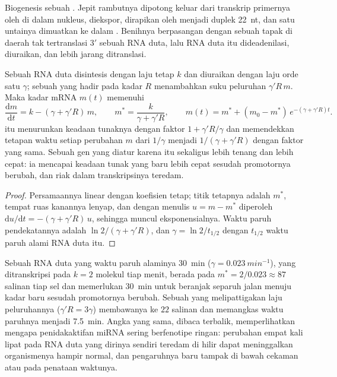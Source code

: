 \begin{omfigure}
{\small Biogenesis sebuah . Jepit rambutnya dipotong keluar dari
transkrip primernya oleh  di dalam nukleus, diekspor, dirapikan oleh
 menjadi duplek \qty{22}{nt}, dan satu untainya dimuatkan ke dalam
. Benihnya berpasangan dengan sebuah tapak di daerah tak
tertranslasi 3$'$ sebuah RNA duta, lalu RNA duta itu dideadenilasi, diuraikan,
dan lebih jarang ditranslasi.}
\end{omfigure}

\begin{theorem}\label{thm:b3:rna-regulation:mirna-kinetics}
Sebuah RNA duta disintesis dengan laju tetap $k$ dan diuraikan dengan laju
orde satu $\gamma$; sebuah  yang hadir pada kadar $R$ menambahkan
suku peluruhan $\gamma' R\, m$. Maka kadar mRNA $m(t)$ memenuhi
\[
\frac{\mathrm{d}m}{\mathrm{d}t} = k - (\gamma + \gamma' R)\, m,
\qquad
m^{*} = \frac{k}{\gamma + \gamma' R},
\qquad
m(t) = m^{*} + (m_{0} - m^{*})\,e^{-(\gamma + \gamma' R)t}.
\]
 itu menurunkan keadaan tunaknya dengan faktor $1 + \gamma' R/
\gamma$ dan memendekkan tetapan waktu setiap perubahan $m$ dari
$1/\gamma$ menjadi $1/(\gamma + \gamma' R)$ dengan faktor yang sama. Sebuah
gen yang diatur  karena itu sekaligus lebih tenang dan lebih cepat:
ia mencapai keadaan tunak yang baru lebih cepat sesudah promotornya berubah,
dan riak dalam transkripsinya teredam.
\end{theorem}
\begin{proof}
Persamaannya linear dengan koefisien tetap; titik tetapnya adalah $m^{*}$,
tempat ruas kanannya lenyap, dan dengan menulis $u = m - m^{*}$ diperoleh
$\mathrm{d}u/\mathrm{d}t = -(\gamma + \gamma' R)\,u$, sehingga muncul
eksponensialnya. Waktu paruh pendekatannya adalah $\ln 2/(\gamma + \gamma'
R)$, dan $\gamma = \ln 2 / t_{1/2}$ dengan $t_{1/2}$ waktu paruh alami RNA
duta itu.
\end{proof}

\begin{example}\label{ex:b3:rna-regulation:fourfold}
Sebuah RNA duta yang waktu paruh alaminya \qty{30}{min} ($\gamma =
\qty{0.023}{min^{-1}}$), yang ditranskripsi pada $k = 2$ molekul tiap menit,
berada pada $m^{*} = 2/0.023 \approx 87$ salinan tiap sel dan memerlukan
\qty{30}{min} untuk beranjak separuh jalan menuju kadar baru sesudah
promotornya berubah. Sebuah  yang melipattigakan laju peluruhannya
($\gamma' R = 3\gamma$) membawanya ke $22$ salinan dan memangkas waktu
paruhnya menjadi \qty{7.5}{min}. Angka yang sama, dibaca terbalik,
memperlihatkan mengapa penidakaktifan miRNA sering berfenotipe ringan:
perubahan empat kali lipat pada RNA duta yang dirinya sendiri teredam di
hilir dapat meninggalkan organismenya hampir normal, dan pengaruhnya baru
tampak di bawah cekaman atau pada penataan waktunya.
\end{example}


